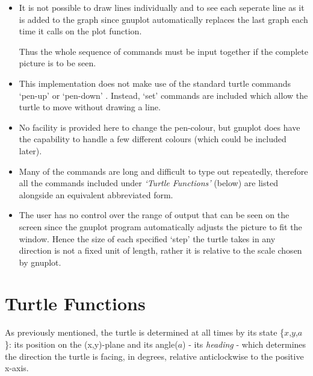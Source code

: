 \documentclass[11pt]{article}
\begin{document}
\begin{itemize}
 \item It is not possible to draw lines individually and to see each
        seperate line as it is added to the graph since gnuplot
        automatically replaces the last graph each time it calls on
        the plot function.

       Thus the whole sequence of commands must be input together if
        the complete picture is to be seen.
 \item This implementation does not make use of the standard turtle
        commands `pen-up' or `pen-down' . Instead, `set' commands are
        included which allow the turtle to move without drawing a line.
 \item No facility is provided here to change the pen-colour, but gnuplot
        does have the capability to handle a few different colours (which
        could be included later).
 \item Many of the commands are long and difficult to type out repeatedly,
        therefore all the commands included under {\em `Turtle Functions'}
        (below) are listed alongside an equivalent abbreviated form.
 \item The user has no control over the range of output that can be seen
        on the screen since the gnuplot program automatically adjusts the
        picture to fit the window. Hence the size of each specified `step'
        the turtle takes in any direction is not a fixed unit of length,
        rather it is relative to the scale chosen by gnuplot.
\end{itemize}


\section{Turtle Functions}
 As previously mentioned, the turtle is determined at all times by its
state \{$x$,$y$,$a$\}: its position on the \mbox{(x,y)-plane} and its
angle($a$) - its {\em heading} - which determines the direction the
turtle is facing, in degrees, relative anticlockwise to the positive
x-axis.     
       
\end{document}
